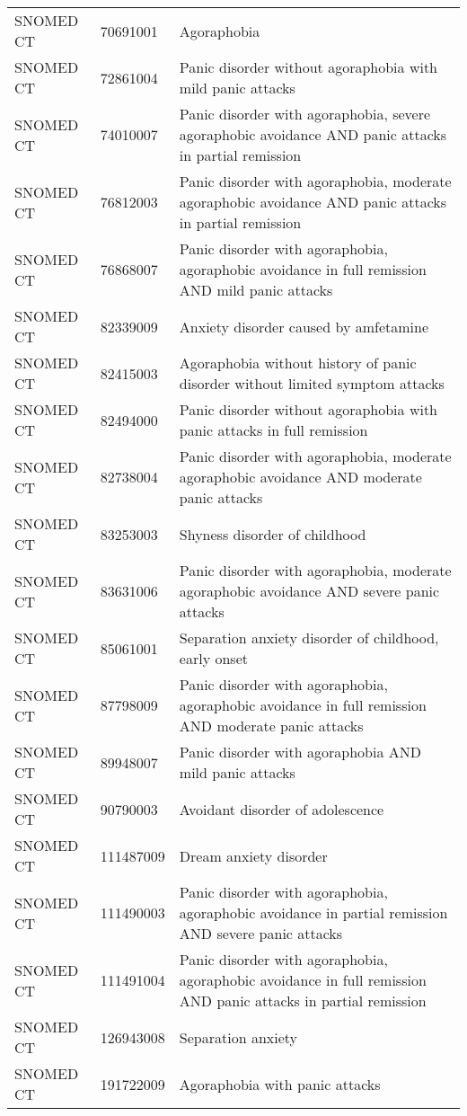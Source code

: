 \begin{longtable}{p{}p{}p{}}
  SNOMED CT & 70691001 & Agoraphobia \\ 
  SNOMED CT & 72861004 & Panic disorder without agoraphobia with mild panic attacks \\ 
  SNOMED CT & 74010007 & Panic disorder with agoraphobia, severe agoraphobic avoidance AND panic attacks in partial remission \\ 
  SNOMED CT & 76812003 & Panic disorder with agoraphobia, moderate agoraphobic avoidance AND panic attacks in partial remission \\ 
  SNOMED CT & 76868007 & Panic disorder with agoraphobia, agoraphobic avoidance in full remission AND mild panic attacks \\ 
  SNOMED CT & 82339009 & Anxiety disorder caused by amfetamine \\ 
  SNOMED CT & 82415003 & Agoraphobia without history of panic disorder without limited symptom attacks \\ 
  SNOMED CT & 82494000 & Panic disorder without agoraphobia with panic attacks in full remission \\ 
  SNOMED CT & 82738004 & Panic disorder with agoraphobia, moderate agoraphobic avoidance AND moderate panic attacks \\ 
  SNOMED CT & 83253003 & Shyness disorder of childhood \\ 
  SNOMED CT & 83631006 & Panic disorder with agoraphobia, moderate agoraphobic avoidance AND severe panic attacks \\ 
  SNOMED CT & 85061001 & Separation anxiety disorder of childhood, early onset \\ 
  SNOMED CT & 87798009 & Panic disorder with agoraphobia, agoraphobic avoidance in full remission AND moderate panic attacks \\ 
  SNOMED CT & 89948007 & Panic disorder with agoraphobia AND mild panic attacks \\ 
  SNOMED CT & 90790003 & Avoidant disorder of adolescence \\ 
  SNOMED CT & 111487009 & Dream anxiety disorder \\ 
  SNOMED CT & 111490003 & Panic disorder with agoraphobia, agoraphobic avoidance in partial remission AND severe panic attacks \\ 
  SNOMED CT & 111491004 & Panic disorder with agoraphobia, agoraphobic avoidance in full remission AND panic attacks in partial remission \\ 
  SNOMED CT & 126943008 & Separation anxiety \\ 
  SNOMED CT & 191722009 & Agoraphobia with panic attacks \\ 

\end{longtable}
